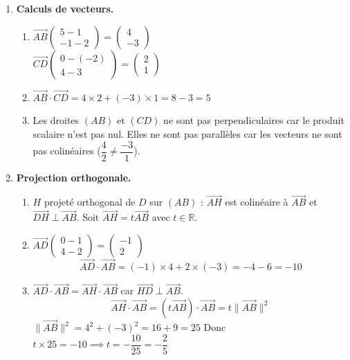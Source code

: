 \documentclass[a4paper,12pt]{article}
\begin{document}
\begin{enumerate}
\item \textbf{Calculs de vecteurs.}
\begin{enumerate}
\item $\overrightarrow{AB} \begin{pmatrix} 5-1 \\ -1-2 \end{pmatrix} = \begin{pmatrix} 4 \\ -3 \end{pmatrix}$ \\
$\overrightarrow{CD} \begin{pmatrix} 0-(-2) \\ 4-3 \end{pmatrix} = \begin{pmatrix} 2 \\ 1 \end{pmatrix}$

\item $\overrightarrow{AB} \cdot \overrightarrow{CD} = 4 \times 2 + (-3) \times 1 = 8 - 3 = 5$

\item Les droites $(AB)$ et $(CD)$ ne sont pas perpendiculaires car le produit scalaire n'est pas nul. Elles ne sont pas parallèles car les vecteurs ne sont pas colinéaires ($\dfrac{4}{2} \neq \dfrac{-3}{1}$).
\end{enumerate}

\item \textbf{Projection orthogonale.}
\begin{enumerate}
\item $H$ projeté orthogonal de $D$ sur $(AB)$ : $\overrightarrow{AH}$ est colinéaire à $\overrightarrow{AB}$ et $\overrightarrow{DH} \perp \overrightarrow{AB}$.
Soit $\overrightarrow{AH} = t \overrightarrow{AB}$ avec $t \in \mathbb{R}$.

\item $\overrightarrow{AD} \begin{pmatrix} 0-1 \\ 4-2 \end{pmatrix} = \begin{pmatrix} -1 \\ 2 \end{pmatrix}$
\[
\overrightarrow{AD} \cdot \overrightarrow{AB} = (-1) \times 4 + 2 \times (-3) = -4 - 6 = -10
\]

\item $\overrightarrow{AD} \cdot \overrightarrow{AB} = \overrightarrow{AH} \cdot \overrightarrow{AB}$ car $\overrightarrow{HD} \perp \overrightarrow{AB}$.
\[
\overrightarrow{AH} \cdot \overrightarrow{AB} = (t \overrightarrow{AB}) \cdot \overrightarrow{AB} = t \|\overrightarrow{AB}\|^2
\]
$\|\overrightarrow{AB}\|^2 = 4^2 + (-3)^2 = 16 + 9 = 25$
Donc $t \times 25 = -10 \implies t = -\dfrac{10}{25} = -\dfrac{2}{5}$


\end{enumerate}
\end{enumerate}
\end{document}
